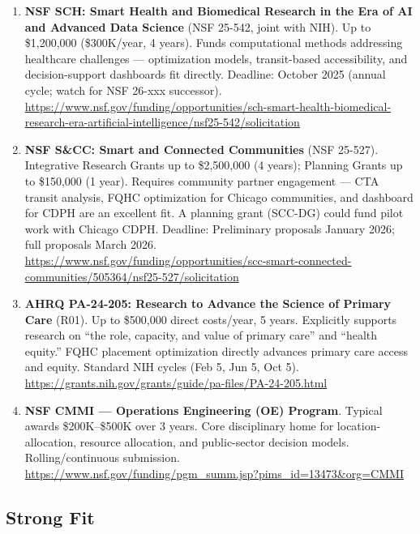 \documentclass[11pt]{article}
\begin{document}
\begin{enumerate}

\item \textbf{NSF SCH: Smart Health and Biomedical Research in the Era of AI and Advanced Data Science} (NSF 25-542, joint with NIH). Up to \$1,200,000 (\$300K/year, 4 years). Funds computational methods addressing healthcare challenges — optimization models, transit-based accessibility, and decision-support dashboards fit directly. Deadline: October 2025 (annual cycle; watch for NSF 26-xxx successor). \\
\url{https://www.nsf.gov/funding/opportunities/sch-smart-health-biomedical-research-era-artificial-intelligence/nsf25-542/solicitation}

\item \textbf{NSF S\&CC: Smart and Connected Communities} (NSF 25-527). Integrative Research Grants up to \$2,500,000 (4 years); Planning Grants up to \$150,000 (1 year). Requires community partner engagement — CTA transit analysis, FQHC optimization for Chicago communities, and dashboard for CDPH are an excellent fit. A planning grant (SCC-DG) could fund pilot work with Chicago CDPH. Deadline: Preliminary proposals January 2026; full proposals March 2026. \\
\url{https://www.nsf.gov/funding/opportunities/scc-smart-connected-communities/505364/nsf25-527/solicitation}

\item \textbf{AHRQ PA-24-205: Research to Advance the Science of Primary Care} (R01). Up to \$500,000 direct costs/year, 5 years. Explicitly supports research on ``the role, capacity, and value of primary care'' and ``health equity.'' FQHC placement optimization directly advances primary care access and equity. Standard NIH cycles (Feb 5, Jun 5, Oct 5). \\
\url{https://grants.nih.gov/grants/guide/pa-files/PA-24-205.html}

\item \textbf{NSF CMMI — Operations Engineering (OE) Program}. Typical awards \$200K--\$500K over 3 years. Core disciplinary home for location-allocation, resource allocation, and public-sector decision models. Rolling/continuous submission. \\
\url{https://www.nsf.gov/funding/pgm_summ.jsp?pims_id=13473&org=CMMI}

\end{enumerate}

\subsection*{Strong Fit}
\end{document}

